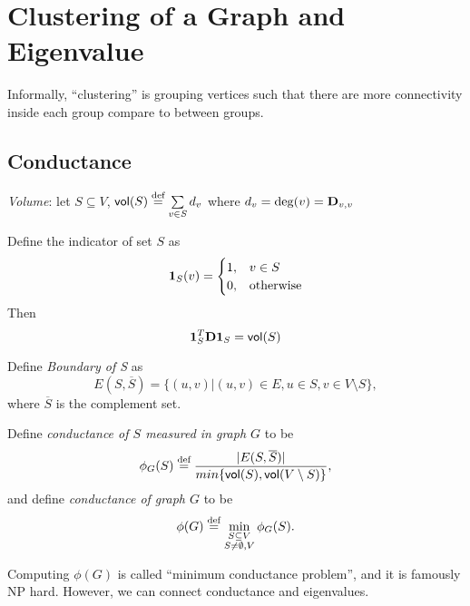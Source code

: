 \documentclass[11pt]{article}
\newcommand\idenVec{\V{1}}
\begin{document}
\newcommand{\coursenum}{{CSC 2421H}}
\newcommand{\coursename}{{Graphs, Matrices, and Optimization}}
\newcommand{\courseprof}{Sushant Sachdeva}


\section{Clustering of a Graph and Eigenvalue}

Informally, ``clustering'' is grouping vertices such that there are more connectivity inside each group compare to between groups. 

\subsection{Conductance}
\begin{definition}
\emph{Volume}: let $S \subseteq V$, $\operatorname{\mathsf{vol}}(S)\stackrel{\textup{def}}{=}\sum\limits_{v \in S} d_v$ where $d_v = \deg(v) = \V{D}_{v, v}$
\end{definition}

\begin{lemma}
Define the indicator of set $S$ as 
\begin{align*}
\idenVec_S (v)
&=\begin{cases}1,&v\in S\\0,&\text{otherwise}\end{cases}\\
\end{align*}
Then $$\idenVec_S^T\V{D}\idenVec_S = \vol(S)$$
\end{lemma}

\begin{definition}
Define \emph{Boundary of S} as $$E(S, \overline{S}) = \{(u,v) | (u,v) \in E, u\in S, v \in V\setminus S\},$$ where $\overline{S}$ is the complement set.
\end{definition}

\begin{definition}
Define \emph{conductance of $S$ measured in graph $G$} to be $$\phi_G(S) \stackrel{\textup{def}}{=}\frac{|E(S, \overline{S})|}{min\{\operatorname{\mathsf{vol}}(S), \operatorname{\mathsf{vol}}(V\setminus S)\}},$$
and define \emph{conductance of graph $G$} to be $$\phi(G) \stackrel{\textup{def}}{=} \min\limits_{\substack{S \subseteq V\\ S\neq \emptyset, V}}\phi_G(S).$$
\end{definition}
Computing $\phi(G)$ is called ``minimum conductance problem'', and it is famously NP hard. However, we can connect conductance and eigenvalues. 
\end{document}
